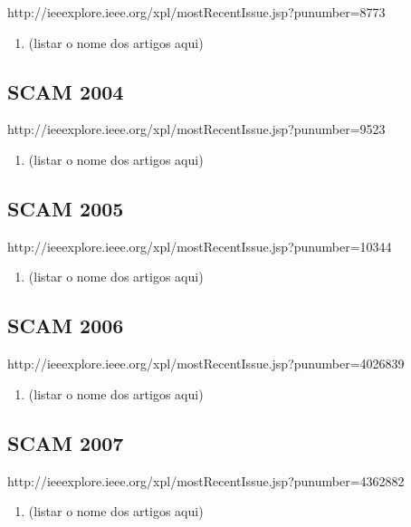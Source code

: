 http://ieeexplore.ieee.org/xpl/mostRecentIssue.jsp?punumber=8773

\begin{enumerate}[itemsep=-1ex]
  \item (listar o nome dos artigos aqui)
\end{enumerate}

\subsection{SCAM 2004}

http://ieeexplore.ieee.org/xpl/mostRecentIssue.jsp?punumber=9523

\begin{enumerate}[itemsep=-1ex]
  \item (listar o nome dos artigos aqui)
\end{enumerate}

\subsection{SCAM 2005}

http://ieeexplore.ieee.org/xpl/mostRecentIssue.jsp?punumber=10344

\begin{enumerate}[itemsep=-1ex]
  \item (listar o nome dos artigos aqui)
\end{enumerate}

\subsection{SCAM 2006}

http://ieeexplore.ieee.org/xpl/mostRecentIssue.jsp?punumber=4026839

\begin{enumerate}[itemsep=-1ex]
  \item (listar o nome dos artigos aqui)
\end{enumerate}

\subsection{SCAM 2007}

http://ieeexplore.ieee.org/xpl/mostRecentIssue.jsp?punumber=4362882

\begin{enumerate}[itemsep=-1ex]
  \item (listar o nome dos artigos aqui)
\end{enumerate}

